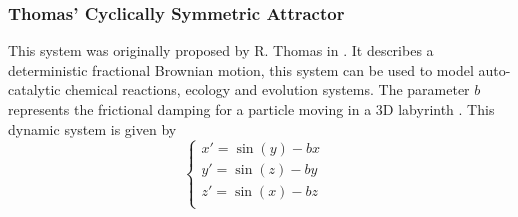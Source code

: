 \subsubsection{Thomas' Cyclically Symmetric Attractor}
This system was originally proposed by R. Thomas in \cite{thomas1999deterministic}. It describes a deterministic fractional Brownian motion, this system can be used to model auto-catalytic chemical reactions, ecology and evolution systems. The parameter $b$ represents the frictional damping for a particle moving in a 3D labyrinth \cite{sprott2007labyrinth}. This dynamic system is given by
\begin{equation}
    \begin{cases}
        x'=\sin(y)-bx&\\
        y'=\sin(z)-by&\\
        z'=\sin(x)-bz&\\
    \end{cases}
\end{equation}

